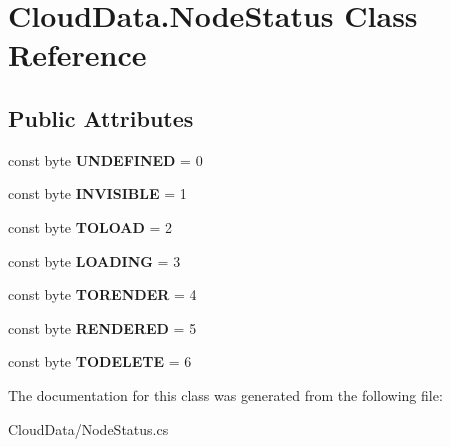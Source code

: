 \hypertarget{class_cloud_data_1_1_node_status}{}\section{Cloud\+Data.\+Node\+Status Class Reference}
\label{class_cloud_data_1_1_node_status}
\subsection*{Public Attributes}
\begin{DoxyCompactItemize}
\item 
\mbox{\label{class_cloud_data_1_1_node_status_a25b14adab04420375b9662534775b5ed}} 
const byte {\bfseries U\+N\+D\+E\+F\+I\+N\+ED} = 0
\item 
\mbox{\label{class_cloud_data_1_1_node_status_a1e92a889b9c916f2aadfbbab1fcf44b7}} 
const byte {\bfseries I\+N\+V\+I\+S\+I\+B\+LE} = 1
\item 
\mbox{\label{class_cloud_data_1_1_node_status_a6c5addd73d19f87bcf3b6da9aa8c5543}} 
const byte {\bfseries T\+O\+L\+O\+AD} = 2
\item 
\mbox{\label{class_cloud_data_1_1_node_status_a64bcc523704b3b66684ccb832cc82edd}} 
const byte {\bfseries L\+O\+A\+D\+I\+NG} = 3
\item 
\mbox{\label{class_cloud_data_1_1_node_status_a753f31245c81cf53c4f88784ea0d07cc}} 
const byte {\bfseries T\+O\+R\+E\+N\+D\+ER} = 4
\item 
\mbox{\label{class_cloud_data_1_1_node_status_ac526d13f6f73a705ba4f2adbf9f0fc03}} 
const byte {\bfseries R\+E\+N\+D\+E\+R\+ED} = 5
\item 
\mbox{\label{class_cloud_data_1_1_node_status_a8d2081213b558350b9cd0283ef173dbf}} 
const byte {\bfseries T\+O\+D\+E\+L\+E\+TE} = 6
\end{DoxyCompactItemize}


The documentation for this class was generated from the following file\+:\begin{DoxyCompactItemize}
\item 
Cloud\+Data/Node\+Status.\+cs\end{DoxyCompactItemize}
